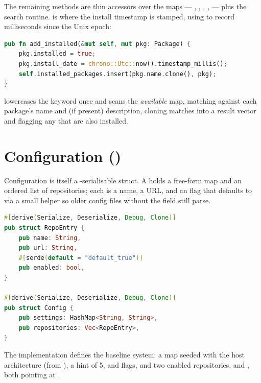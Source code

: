 The remaining methods are thin accessors over the maps --- , , , ,  --- plus the search routine.  is where the install timestamp is stamped, using  to record milliseconds since the Unix epoch:

\begin{lstlisting}[language=Rust, caption={\file{db.rs} --- recording an installed package}]
pub fn add_installed(&mut self, mut pkg: Package) {
    pkg.installed = true;
    pkg.install_date = chrono::Utc::now().timestamp_millis();
    self.installed_packages.insert(pkg.name.clone(), pkg);
}
\end{lstlisting}

 lowercases the keyword once and scans the \emph{available} map, matching against each package's name and (if present) description, cloning matches into a result vector and flagging any that are also installed.

\section{Configuration ()}

Configuration is itself a -serialisable struct. A  holds a free-form  map and an ordered list of repositories; each  is a name, a URL, and an  flag that defaults to  via a small helper so older config files without the field still parse.

\begin{lstlisting}[language=Rust, caption={\file{config.rs} --- the configuration types}]
#[derive(Serialize, Deserialize, Debug, Clone)]
pub struct RepoEntry {
    pub name: String,
    pub url: String,
    #[serde(default = "default_true")]
    pub enabled: bool,
}

#[derive(Serialize, Deserialize, Debug, Clone)]
pub struct Config {
    pub settings: HashMap<String, String>,
    pub repositories: Vec<RepoEntry>,
}
\end{lstlisting}

The  implementation defines the baseline system: a  map seeded with the host architecture (from ), a  hint of 5,  and  flags, and two enabled repositories,  and , both pointing at .


